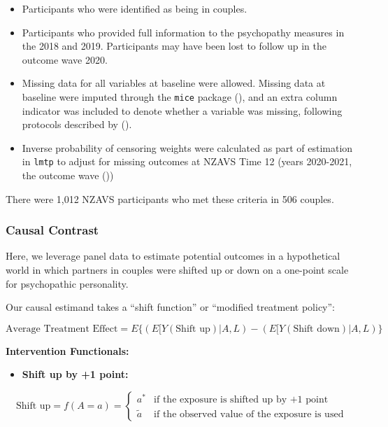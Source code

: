 \documentclass[
  singlecolumn]{article}
\providecommand{\tightlist}{%
  \setlength{\itemsep}{0pt}\setlength{\parskip}{0pt}}\usepackage{longtable,booktabs,array}
\begin{document}
\begin{itemize}
\tightlist
\item
  Participants who were identified as being in couples.\\
\item
  Participants who provided full information to the psychopathy measures
  in the 2018 and 2019. Participants may have been lost to follow up in
  the outcome wave 2020.
\item
  Missing data for all variables at baseline were allowed. Missing data
  at baseline were imputed through the \texttt{mice} package
  (), and an extra column
  indicator was included to denote whether a variable was missing,
  following protocols described by ().
\item
  Inverse probability of censoring weights were calculated as part of
  estimation in \texttt{lmtp} to adjust for missing outcomes at NZAVS
  Time 12 (years 2020-2021, the outcome wave
  ())
\end{itemize}

There were 1,012 NZAVS participants who met these criteria in 506
couples.

\subsubsection{Causal Contrast}\label{causal-contrast}

Here, we leverage panel data to estimate potential outcomes in a
hypothetical world in which partners in couples were shifted up or down
on a one-point scale for psychopathic personality.

Our causal estimand takes a ``shift function'' or ``modified treatment
policy'':

\[ \text{Average Treatment Effect} = E\{(E[Y(\text{Shift up})|A,L) - (E[Y(\text{Shift down})|A,L)\} \]

\textbf{Intervention Functionals:}

\begin{itemize}
\tightlist
\item
  \textbf{Shift up by +1 point:}
\end{itemize}

\[
\text{Shift up} = f(A = a) = 
\begin{cases}
  a^* & \text{if the exposure is shifted up by +1 point} \\
  \tilde{a} & \text{if the observed value of the exposure is used}
\end{cases}
\]
\end{document}
